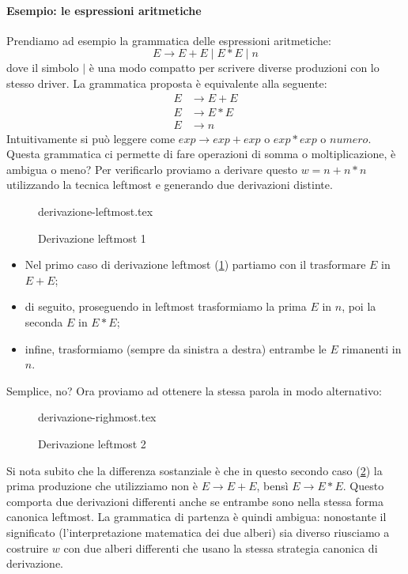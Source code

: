 \documentclass[class=book, crop=false, oneside, 12pt]{standalone}
\begin{document}
\paragraph{Esempio: le espressioni aritmetiche}
Prendiamo ad esempio la grammatica delle espressioni aritmetiche:
\begin{equation}
    E \to E+E \mid E*E \mid  n
\end{equation}
dove il simbolo \(\mid\) è una modo compatto per scrivere diverse produzioni con lo stesso driver. La grammatica proposta è equivalente alla seguente: 
\begin{align*}
    E &\to E+E \\
    E &\to E*E \\
    E &\to n
\end{align*}
Intuitivamente si può leggere come \(exp \to exp+exp\)  o  \(exp*exp\)  o  \(numero\).\\
Questa grammatica ci permette di fare operazioni di somma o moltiplicazione, è ambigua o meno? Per verificarlo proviamo a derivare questo \(w = n+n*n\) utilizzando la tecnica leftmost e generando due derivazioni distinte.
\begin{figure}[H]
	\centering
	{derivazione-leftmost.tex}
    \caption{Derivazione leftmost 1}
    \label{leftmost_1}
\end{figure}
\begin{itemize}
    \item Nel primo caso di derivazione leftmost (\ref{leftmost_1}) partiamo con il trasformare \(E\) in \(E+E\);
    \item di seguito, proseguendo in leftmost trasformiamo la prima \(E\) in \(n\), poi la seconda \(E\) in \(E*E\);
    \item infine, trasformiamo (sempre da sinistra a destra) entrambe le \(E\) rimanenti in \(n\).
\end{itemize}
Semplice, no? Ora proviamo ad ottenere la stessa parola in modo alternativo:
\begin{figure}[H]
	\centering
	{derivazione-righmost.tex}
    \caption{Derivazione leftmost 2}
    \label{leftmost_2}
\end{figure}
Si nota subito che la differenza sostanziale è che in questo secondo caso (\ref{leftmost_2}) la prima produzione che utilizziamo non è \(E \to E+E\), bensì \(E \to E*E\). Questo comporta due derivazioni differenti anche se entrambe sono nella stessa forma canonica leftmost.
La grammatica di partenza è quindi ambigua: nonostante il significato (l'interpretazione matematica dei due alberi) sia diverso riusciamo a costruire \(w\) con due alberi differenti che usano la stessa strategia canonica di derivazione.
\end{document}
